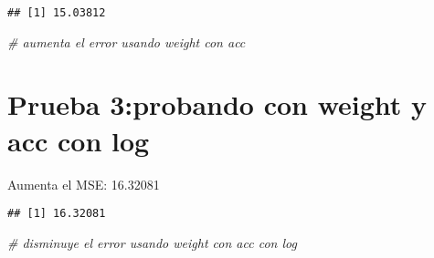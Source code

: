 \documentclass[]{article}
\newenvironment{Shaded}{\begin{snugshade}}{\end{snugshade}}
\newcommand{\CommentTok}[1]{\textcolor[rgb]{0.56,0.35,0.01}{\textit{#1}}}
\newcommand{\DataTypeTok}[1]{\textcolor[rgb]{0.13,0.29,0.53}{#1}}
\newcommand{\DecValTok}[1]{\textcolor[rgb]{0.00,0.00,0.81}{#1}}
\newcommand{\KeywordTok}[1]{\textcolor[rgb]{0.13,0.29,0.53}{\textbf{#1}}}
\newcommand{\NormalTok}[1]{#1}
\newcommand{\OperatorTok}[1]{\textcolor[rgb]{0.81,0.36,0.00}{\textbf{#1}}}
\newcommand{\StringTok}[1]{\textcolor[rgb]{0.31,0.60,0.02}{#1}}
\begin{document}
\begin{verbatim}
## [1] 15.03812
\end{verbatim}

\begin{Shaded}
\begin{Highlighting}[]
\CommentTok{# aumenta el error usando weight con acc}
\end{Highlighting}
\end{Shaded}

\hypertarget{prueba-3probando-con-weight-y-acc-con-log}{%
\section{Prueba 3:probando con weight y acc con
log}\label{prueba-3probando-con-weight-y-acc-con-log}}

Aumenta el MSE: 16.32081

\begin{Shaded}
\end{Shaded}

\begin{verbatim}
## [1] 16.32081
\end{verbatim}

\begin{Shaded}
\begin{Highlighting}[]
\CommentTok{# disminuye el error usando weight con acc con log}
\end{Highlighting}
\end{Shaded}
\end{document}
